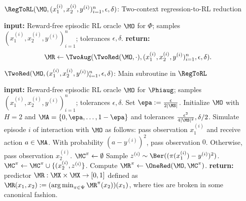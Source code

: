 
\begin{algorithm}[t]
    \caption{$\RegToRL(\MO,(x_1^{(i)},x_2^{(i)},y^{(i)})_{i=1}^n,\epsilon,\delta)$: Two-context regression-to-RL reduction}
    \label{alg:regtorl}
	\begin{algorithmic}[1]\onehalfspacing
          \State \textbf{input:} Reward-free episodic RL oracle $\MO$ for $\Phi$; samples $(x_1^{(i)},x_2^{(i)},y^{(i)})_{i=1}^n$; tolerances $\epsilon,\delta$.
		\State \textbf{return:} \[\MR \gets \TwoAug(\TwoRed(\MO,\cdot),(x_1^{(i)},x_2^{(i)},y^{(i)})_{i=1}^n,\epsilon,\delta).\]
	\end{algorithmic}
\end{algorithm}


\begin{algorithm}[t]
	\caption{$\TwoRed(\MO,(x_1^{(i)},x_2^{(i)},y^{(i)})_{i=1}^n,\epsilon,\delta)$: Main subroutine in $\RegToRL$}
	\label{alg:twored}
	\begin{algorithmic}[1]\onehalfspacing
          \State \textbf{input:} Reward-free episodic RL oracle $\MO$ for $\Phiaug$; samples $(x_1^{(i)},x_2^{(i)},y^{(i)})_{i=1}^n$; tolerances $\epsilon,\delta$.
		\State Set $\epa := \frac{\epsilon}{2|\MS|}$. Initialize $\MO$ with $H = 2$ and $\MA = \{0,\epa,\dots,1-\epa\}$ and tolerances $\frac{\epsilon^2}{4|\MS|^2},\delta/2$.\label{line:initialize-oracle}
        \Repeat
            \State Simulate episode $i$ of interaction with $\MO$ as follows: pass observation $x_1^{(i)}$ and receive action $a \in \MA$. With probability $(a - y^{(i)})^2$, pass observation $0$. Otherwise, pass observation $x_2^{(i)}$.
        \label{line:oracle-policy-cover}
        \For{$\pi \in \Psi$}
            \State $\MC^\pi \gets \emptyset$
                \State Sample $z^{(i)} \sim \Ber((\pi(x_1^{(i)}) - y^{(i)})^2)$.
                \State $\MC^\pi \gets \MC^\pi \cup \{(x_2^{(i)}, z^{(i)}\}$.
            \EndFor 
            \State Compute $\MR^\pi \gets \OneRed(\MO, \MC^\pi)$.
        \EndFor
        \State \textbf{return:} predictor $\MR: \MX \times \MX \to [0,1]$ defined as $\MR(x_1,x_2) := (\argmin_{\pi \in \Psi} \MR^\pi(x_2))(x_1)$, where ties are broken in some canonical fashion.
	\end{algorithmic}
\end{algorithm}